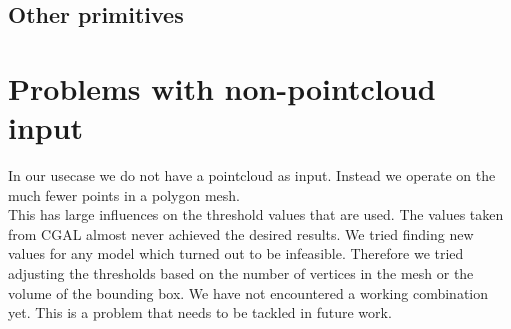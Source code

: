 \documentclass[../ClassicThesis.tex]{subfiles}
\begin{document}
\subsection{Other primitives}
\section{Problems with non-pointcloud input}
In our usecase we do not have a pointcloud as input. Instead we operate on the much fewer points in a polygon mesh.\\
This has large influences on the threshold values that are used. The values taken from CGAL almost never achieved the desired results. We tried finding new values for any model which turned out to be infeasible. Therefore we tried adjusting the thresholds based on the number of vertices in the mesh or the volume of the bounding box. We have not encountered a working combination yet. This is a problem that needs to be tackled in future work.
\end{document}
